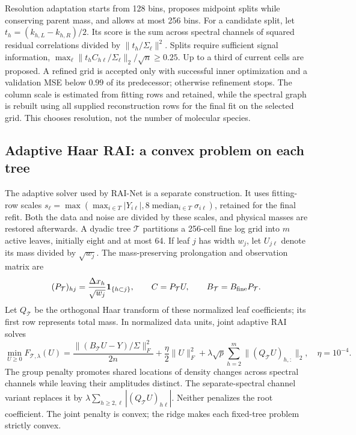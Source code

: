 Resolution adaptation starts from 128 bins, proposes midpoint splits while conserving parent mass, and allows at most 256 bins. For a candidate split, let $t_h=(k_{h,L}-k_{h,R})/2$. Its score is the sum across spectral channels of squared residual correlations divided by $\|t_h/\Sigma_\ell\|^2$. Splits require sufficient signal information, $\max_\ell\|t_h C_{h\ell}/\Sigma_\ell\|_2/\sqrt n\geq0.25$. Up to a third of current cells are proposed. A refined grid is accepted only with successful inner optimization and a validation MSE below $0.99$ of its predecessor; otherwise refinement stops. The column scale is estimated from fitting rows and retained, while the spectral graph is rebuilt using all supplied reconstruction rows for the final fit on the selected grid. This chooses resolution, not the number of molecular species.

\subsection{Adaptive Haar RAI: a convex problem on each tree}\label{sec:raiadaptive}
The adaptive solver used by RAI-Net is a separate construction. It uses fitting-row scales $s_\ell=\max(\max_{i\in T}|Y_{i\ell}|,8\operatorname{median}_{i\in T}\sigma_{i\ell})$, retained for the final refit. Both the data and noise are divided by these scales, and physical masses are restored afterwards. A dyadic tree $\mathcal T$ partitions a 256-cell fine log grid into $m$ active leaves, initially eight and at most 64. If leaf $j$ has width $w_j$, let $U_{j\ell}$ denote its mass divided by $\sqrt{w_j}$. The mass-preserving prolongation and observation matrix are
\begin{equation}\label{eq:raiprojection}
 (P_{\mathcal T})_{hj}=\frac{\Delta x_h}{\sqrt{w_j}}\mathbf{1}_{\{h\subset j\}},
 \qquad C=P_{\mathcal T}U,\qquad B_{\mathcal T}=B_{\rm fine}P_{\mathcal T}.
\end{equation}
Let $Q_{\mathcal T}$ be the orthogonal Haar transform of these normalized leaf coefficients; its first row represents total mass. In normalized data units, joint adaptive RAI solves
\begin{equation}\label{eq:raihaar}
 \min_{U\geq0} F_{\mathcal T,\lambda}(U)
 =\frac{\|(B_{\mathcal T}U-Y)/\Sigma\|_F^2}{2n}
 +\frac{\eta}{2}\|U\|_F^2
 +\lambda\sqrt p\sum_{h=2}^{m}\|(Q_{\mathcal T}U)_{h,:}\|_2,
 \quad \eta=10^{-4}.
\end{equation}
The group penalty promotes shared locations of density changes across spectral channels while leaving their amplitudes distinct. The separate-spectral channel variant replaces it by $\lambda\sum_{h\geq2,\ell}|(Q_{\mathcal T}U)_{h\ell}|$. Neither penalizes the root coefficient. The joint penalty is convex; the ridge makes each fixed-tree problem strictly convex.

